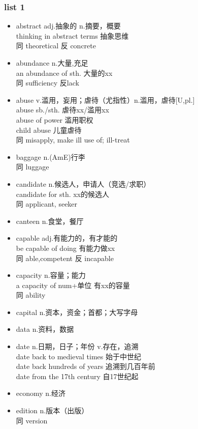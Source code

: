\documentclass[11pt,a4paper,UTF8,titlepage]{ctexart} %
\begin{document}
    \subsubsection{list 1}
    \begin{multicols}{2}
    \begin{itemize}
        \item abstract adj.抽象的 n.摘要，概要\\thinking in abstract terms 抽象思维\\同 theoretical 反 concrete
        \item abundance n.大量,充足\\an abundance of sth. 大量的xx\\同 sufficiency 反lack
        \item abuse v.滥用，妄用；虐待（尤指性）n.滥用，虐待[U,pl.]\\abuse sb./sth. 虐待xx/滥用xx\\ abuse of power 滥用职权\\ child abuse 儿童虐待\\同 misapply, make ill use of; ill-treat
        \item baggage n.(AmE)行李 \\同 luggage
        \item candidate n.候选人，申请人（竞选/求职）\\candidate for sth. xx的候选人\\同 applicant, seeker
        \item canteen n.食堂，餐厅
        \item capable adj.有能力的，有才能的\\be capable of doing 有能力做xx\\同 able,competent 反 incapable
        \item capacity n.容量；能力\\a capacity of num+单位 有xx的容量\\同 ability
        \item capital n.资本，资金；首都；大写字母
        \item data n.资料，数据
        \item date n.日期，日子；年份 v.存在，追溯\\date back to medieval times 始于中世纪\\date back hundreds of years 追溯到几百年前\\date from the 17th century 自17世纪起
        \item economy n.经济
        \item edition n.版本（出版）\\同 version

\end{itemize}
\end{multicols}
\end{document}
